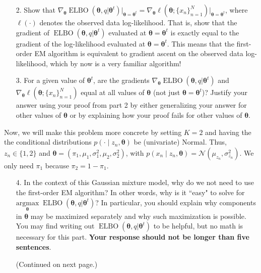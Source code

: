 \documentclass[submit]{harvardml}
\begin{document}
\begin{problem}
\begin{enumerate}
\item[2.] Show that $\nabla_{\bm\theta} \operatorname{ELBO}(\bm \theta, q | \bm \theta^t) \big|_{\bm \theta = \bm \theta^t} = \nabla_{\bm\theta}\ell(\bm\theta; \{x_n\}_{n = 1}^N)\big|_{\bm \theta = \bm \theta^t}$, where $\ell(\cdot)$ denotes the observed data log-likelihood. That is, show that the gradient of $\operatorname{ELBO}(\bm \theta, q | \bm \theta^t)$ evaluated at $\bm \theta = \bm \theta^t$ is exactly equal to the gradient of the log-likelihood evaluated at $\bm \theta = \bm \theta^t$. This means that the first-order EM algorithm is equivalent to gradient ascent on the observed data log-likelihood, which by now is a very familiar algorithm!

\item[3.] For a given value of $\bm \theta^t$, are the gradients $\nabla_{\bm\theta} \operatorname{ELBO}(\bm \theta, q | \bm \theta^t)$ and $\nabla_{\bm\theta}\ell(\bm\theta; \{x_n\}_{n = 1}^N)$ equal at all values of $\bm \theta$ (not just $\bm \theta = \bm \theta^t$)? Justify your answer using your proof from part 2 by either generalizing your answer for other values of $\bm \theta$ or by explaining how your proof fails for other values of $\bm \theta$.
\end{enumerate}

Now, we will make this problem more concrete by setting $K = 2$ and having the the conditional distributions $p(\cdot \mid z_n, \bm \theta)$ be (univariate) Normal. Thus, $z_n \in \{1, 2\}$ and $\bm\theta = (\pi_1, \mu_1, \sigma_1^2, \mu_2, \sigma_2^2)$, with $p(x_n \mid z_n, \bm \theta) = \mathcal{N}(\mu_{z_n}, \sigma_{z_n}^2)$. We only need $\pi_1$ because $\pi_2 = 1 - \pi_1$.

\begin{enumerate}
\item[4.] In the context of this Gaussian mixture model, why do we not need to use the first-order EM algorithm? In other words, why is it ``easy" to solve for $\underset{\bm\theta}{\text{argmax}}\; \operatorname{ELBO}(\bm \theta, q | \bm \theta^t)$? In particular, you should explain why components in $\bm \theta$ may be maximized separately and why such maximization is possible. You may find writing out $\operatorname{ELBO}(\bm \theta, q | \bm \theta^t)$ to be helpful, but no math is necessary for this part. \textbf{Your response should not be longer than five sentences}.

(Continued on next page.)
\end{enumerate}

\end{problem}
\end{document}
